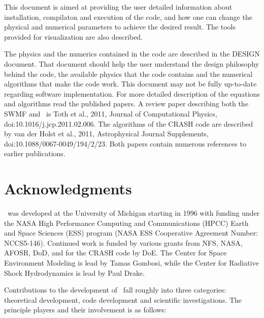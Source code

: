 This document is aimed at providing the user detailed information about
installation, compilaton and execution of the code, and 
how one can change the physical and numerical parameters
to achieve the desired result. The tools provided for visualization
are also described.

The physics and the numerics contained in the code are described in
the DESIGN document. That document should help
the user understand the design philosophy behind the code, the 
available physics that the code contains and the numerical algorithms that
make the code work. This document may not be fully up-to-date regarding
software implementation. For more detailed description of the equations 
and algorithms read the published papers. A review paper describing
both the SWMF and \BATSRUS\ is Toth et al., 2011, Journal of Computational
Physics, doi:10.1016/j.jcp.2011.02.006. The algorithms of the CRASH
code are described by van der Holst et al., 2011, Astrophysical Journal
Supplements, doi:10.1088/0067-0049/194/2/23. Both papers contain numerous
references to earlier publications.

\section{Acknowledgments}

\BATSRUS\ was developed at the University of Michigan starting in 1996
with funding under the NASA High Performance Computing and Communications (HPCC)
Earth and Space Sciences (ESS) program (NASA ESS Cooperative Agreement 
Number: NCCS5-146).  Continued work is funded by various grants from
NFS, NASA, AFOSR, DoD, and for the CRASH code by DoE.
The Center for Space Environment Modeling is lead by Tamas Gombosi, while
the Center for Radiative Shock Hydrodynamics is lead by Paul Drake.

Contributions to the development of \BATSRUS\ fall roughly into three
categories: theoretical development, code development and scientific
investigations. The principle players and their involvement is as follows:

